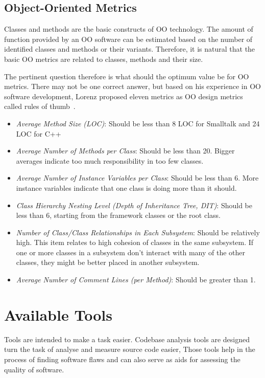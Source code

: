 \subsection{Object-Oriented Metrics}
Classes and methods are the basic constructs of OO technology.
The amount of function provided by an OO software can be estimated based on the number of identified classes and methods or their variants.
Therefore, it is natural that the basic OO metrics are related to classes, methods and their size.

The pertinent question therefore is what should the optimum value be for OO metrics. There may not be one correct answer,
but based on his experience in OO software development, Lorenz proposed eleven metrics as OO design metrics called rules of thumb~\cite{lorenz1994object}.
\begin{itemize}
\item \emph{Average Method Size (LOC)}: Should be less than 8 LOC for Smalltalk and 24 LOC for C++
\item \emph{Average Number of Methods per Class}: Should be less than 20. Bigger averages indicate too much responsibility in too few classes.
\item \emph{Average Number of Instance Variables per Class}: Should be less than 6. More instance variables indicate that one class is doing more than it should.
\item \emph{Class Hierarchy Nesting Level (Depth of Inheritance Tree, DIT)}: Should be less than 6, starting from the framework classes or the root class.
\item \emph{Number of Class/Class Relationships in Each Subsystem}: Should be relatively high. This item relates to high cohesion of classes in the same subsystem. If one or more classes in a subsystem don't interact with many of the other classes, they might be better placed in another subsystem.
\item \emph{Average Number of Comment Lines (per Method)}: Should be greater than 1.
\end{itemize}




\section{Available Tools}
Tools are intended to make a task easier.
Codebase analysis tools are designed turn the task of analyse and measure source code easier,
Those tools help in the process of finding software flaws and can also serve as aids for assessing the quality of software.

